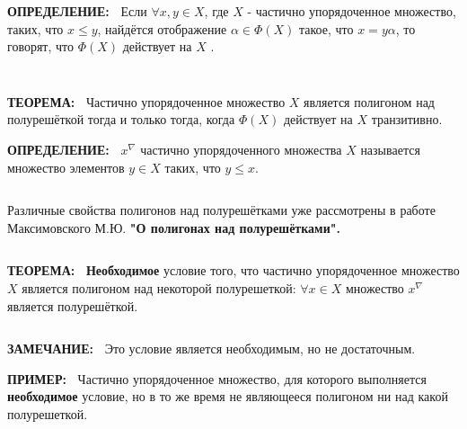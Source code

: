 \documentclass{beamer}
\newcommand{\green}{\color[rgb]{0,0.4,0}}
\newcommand{\red}{\color[rgb]{0.7,0,0}}
\newcommand{\blue}{\color{blue}}
\newcommand{\statement}{%
	 {\bf \green УТВЕРЖДЕНИЕ:\ }}
\newcommand{\theor}{%
     {\bf \green ТЕОРЕМА:\ }}
\newcommand{\definit}{%
     {\bf \green ОПРЕДЕЛЕНИЕ:\ }}
\newcommand{\examp}{%
     {\bf \green ПРИМЕР:\ }}
\newcommand{\remark}{%
     {\bf \green ЗАМЕЧАНИЕ:\ }}
\newcommand{\retline}{
	
$ $

}
\begin{document}
\begin{frame}

{\definit}
Если $\forall x, y \in X$, где $X$ - частично упорядоченное множество, таких, что $x \leq y$, найдётся отображение $\alpha \in \Phi(X)$ такое, что $x = y\alpha$, то говорят, что $\Phi(X)$ действует на $X$ \textit{\blue{транзитивно}}.
{\retline}


{\retline}

{\theor}
Частично упорядоченное множество $X$ является полигоном над полурешёткой тогда и только тогда, когда $\Phi(X)$ действует на $X$ транзитивно.
\end{frame}

\begin{frame}

{\definit}
\textit{\blue{Нижним конусом}} $x^\nabla$ частично упорядоченного множества $X$ называется множество элементов $y \in X$ таких, что $y \leq x$.
{\retline}

Различные свойства полигонов над полурешётками уже рассмотрены в работе Максимовского М.Ю.
{\bf {\red} "О полигонах над полурешётками".}

{\retline}
{\theor}
\textbf{Необходимое} условие того, что частично упорядоченное множество $X$ является полигоном над некоторой полурешеткой: $\forall x \in X$ множество $x^\nabla$ является полурешёткой.

{\retline}
{\remark}
Это условие является необходимым, но не достаточным.
\end{frame}

\begin{frame}

{\examp}
Частично упорядоченное множество, для которого выполняется \textbf{необходимое} условие, но в то же время не являющееся полигоном ни над какой полурешеткой.

\begin{center}
\end{center}
\end{frame}
\end{document}
